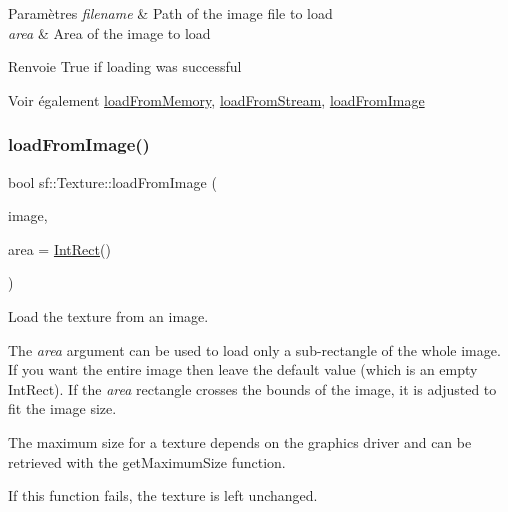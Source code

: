 \begin{DoxyParams}{Paramètres}
{\em filename} & Path of the image file to load \\
\hline
{\em area} & Area of the image to load\\
\hline
\end{DoxyParams}
\begin{DoxyReturn}{Renvoie}
True if loading was successful
\end{DoxyReturn}
\begin{DoxySeeAlso}{Voir également}
\hyperlink{classsf_1_1Texture_a2c4adb19dd4cbee0a588eeb85e52a249}{load\+From\+Memory}, \hyperlink{classsf_1_1Texture_a786b486a46b1c6d1c16ff4af61ecc601}{load\+From\+Stream}, \hyperlink{classsf_1_1Texture_abec4567ad9856a3596dc74803f26fba2}{load\+From\+Image} 
\end{DoxySeeAlso}
\mbox{\label{classsf_1_1Texture_abec4567ad9856a3596dc74803f26fba2}} 
\subsubsection{\texorpdfstring{load\+From\+Image()}{loadFromImage()}}
{\footnotesize\ttfamily bool sf\+::\+Texture\+::load\+From\+Image (\begin{DoxyParamCaption}\item[{const \hyperlink{classsf_1_1Image}{Image} \&}]{image,  }\item[{const \hyperlink{classsf_1_1Rect}{Int\+Rect} \&}]{area = {\ttfamily \hyperlink{classsf_1_1Rect}{Int\+Rect}()} }\end{DoxyParamCaption})}



Load the texture from an image. 

The {\itshape area} argument can be used to load only a sub-\/rectangle of the whole image. If you want the entire image then leave the default value (which is an empty Int\+Rect). If the {\itshape area} rectangle crosses the bounds of the image, it is adjusted to fit the image size.

The maximum size for a texture depends on the graphics driver and can be retrieved with the get\+Maximum\+Size function.

If this function fails, the texture is left unchanged.


